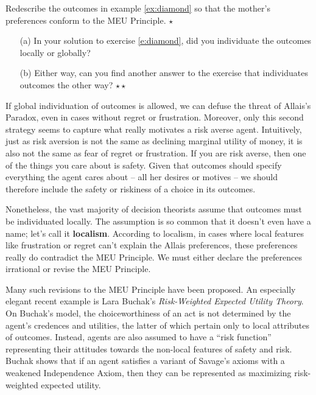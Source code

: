 \begin{exercise}\label{e:diamond}
  Redescribe the outcomes in example \ref{ex:diamond} so that the
  mother's preferences conform to the MEU Principle. $\star$
\end{exercise}

\begin{exercise}
  \leavevmode\vspace{-2em}
  \begin{enumerate}
  \itemsep0em 
  \item[(a)] In your solution to exercise \ref{e:diamond}, did you
    individuate the outcomes locally or globally?
  \item[(b)] Either way, can you find another answer to the exercise that
    individuates outcomes the other way?
    $\star\star$
  \end{enumerate}
  \vspace{-2em}
\end{exercise}

If global individuation of outcomes is allowed, we can defuse the
threat of Allais's Paradox, even in cases without regret or
frustration. Moreover, only this second strategy seems to capture what
really motivates a risk averse agent. Intuitively, just as risk
aversion is not the same as declining marginal utility of money, it is
also not the same as fear of regret or frustration. If you are risk
averse, then one of the things you care about is safety. Given that
outcomes should specify everything the agent cares about -- all her
desires or motives -- we should therefore include the safety or
riskiness of a choice in its outcomes.

Nonetheless, the vast majority of decision theorists assume that
outcomes must be individuated locally. The assumption is so common
that it doesn't even have a name; let's call it
\textbf{localism}. According to localism, in cases where local
features like frustration or regret can't explain the Allais
preferences, these preferences really do contradict the MEU
Principle. We must either declare the preferences irrational or revise
the MEU Principle.

Many such revisions to the MEU Principle have been proposed. An
especially elegant recent example is Lara Buchak's \emph{Risk-Weighted
  Expected Utility Theory}. On Buchak's model, the choiceworthiness of an
act is not determined by the agent's credences and utilities, the
latter of which pertain only to local attributes of outcomes. Instead,
agents are also assumed to have a ``risk function'' representing their
attitudes towards the non-local features of safety and risk. Buchak
shows that if an agent satisfies a variant of Savage's axioms with a
weakened Independence Axiom, then they can be represented as
maximizing risk-weighted expected utility.

